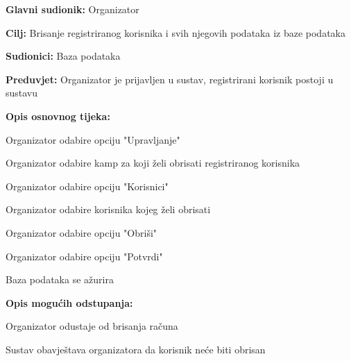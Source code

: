					\noindent {}
					\begin{packed_item}
						
						\item \textbf{Glavni sudionik: }Organizator
						\item  \textbf{Cilj:} Brisanje registriranog korisnika i svih njegovih podataka iz baze podataka
						\item  \textbf{Sudionici:} Baza podataka
						\item  \textbf{Preduvjet:} Organizator je prijavljen u sustav, registrirani korisnik postoji u sustavu
						\item  \textbf{Opis osnovnog tijeka:}
						
						\item[] \begin{packed_enum}
							
							\item Organizator odabire opciju "Upravljanje"
							\item Organizator odabire kamp za koji želi obrisati registriranog korisnika
							\item Organizator odabire opciju "Korisnici"
							\item Organizator odabire korisnika kojeg želi obrisati 
							\item Organizator odabire opciju "Obriši"
							\item Organizator odabire opciju "Potvrdi"
							\item Baza podataka se ažurira
						\end{packed_enum}
						
						\item  \textbf{Opis mogućih odstupanja:}
						
						\item[] \begin{packed_item}
							
							\item[3.a] Organizator odustaje od brisanja računa
							\item[] \begin{packed_enum}
								
								\item Sustav obavještava organizatora da korisnik neće biti obrisan
								
							\end{packed_enum}
							
						\end{packed_item}
					\end{packed_item}
					
